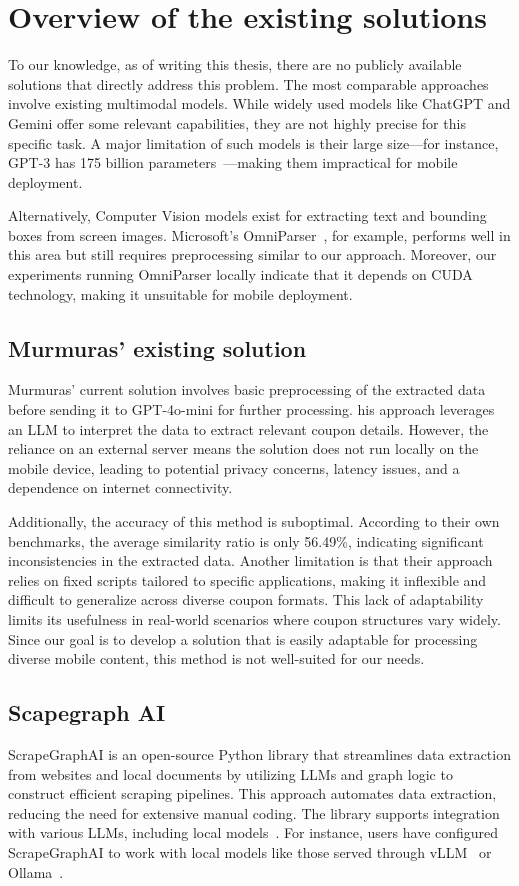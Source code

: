 \documentclass[licencjacka,en]{pracamgr}
\begin{document}
\chapter{Overview of the existing solutions}
To our knowledge, as of writing this thesis, there are no publicly available solutions that directly address this problem. The most comparable approaches involve existing multimodal models. While widely used models like ChatGPT and Gemini offer some relevant capabilities, they are not highly precise for this specific task. A major limitation of such models is their large size—for instance, GPT-3 has 175 billion parameters~\cite{chatgpt_params}—making them impractical for mobile deployment.

Alternatively, Computer Vision models exist for extracting text and bounding boxes from screen images. Microsoft’s OmniParser~\cite{omniparser_intro}, for example, performs well in this area but still requires preprocessing similar to our approach. Moreover, our experiments running OmniParser locally indicate that it depends on CUDA technology, making it unsuitable for mobile deployment.



\section{Murmuras' existing solution} 
Murmuras’ current solution involves basic preprocessing of the extracted data before sending it to GPT-4o-mini for further processing. his approach leverages an LLM to interpret the data to extract relevant coupon details. However, the reliance on an external server means the solution does not run locally on the mobile device, leading to potential privacy concerns, latency issues, and a dependence on internet connectivity. 

Additionally, the accuracy of this method is suboptimal. According to their own benchmarks, the average similarity ratio is only 56.49\%, indicating significant inconsistencies in the extracted data. Another limitation is that their approach relies on fixed scripts tailored to specific applications, making it inflexible and difficult to generalize across diverse coupon formats. This lack of adaptability limits its usefulness in real-world scenarios where coupon structures vary widely. Since our goal is to develop a solution that is easily adaptable for processing diverse mobile content, this method is not well-suited for our needs.


\section{Scapegraph AI}
ScrapeGraphAI is an open-source Python library that streamlines data extraction from websites and local documents by utilizing LLMs and graph logic to construct efficient scraping pipelines. This approach automates data extraction, reducing the need for extensive manual coding. The library supports integration with various LLMs, including local models~\cite{scapegraph_intro}. For instance, users have configured ScrapeGraphAI to work with local models like those served through vLLM~\cite{gh_issue_810_scapegraph} or Ollama~\cite{gh_issue_752_scapegraph}.
\end{document}
